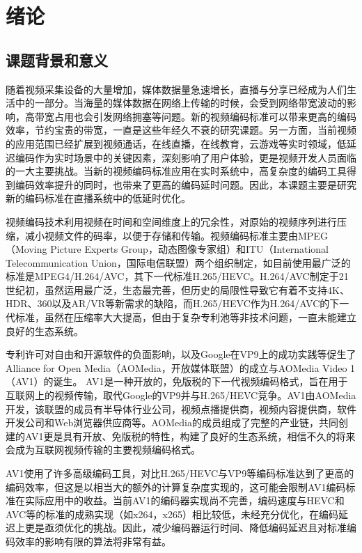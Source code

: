 
\chapter{绪论}
\section{课题背景和意义}

随着视频采集设备的大量增加，媒体数据量急速增长，直播与分享已经成为人们生活中的一部分。当海量的媒体数据在网络上传输的时候，会受到网络带宽波动的影响，高带宽占用也会引发网络拥塞等问题。新的视频编码标准可以带来更高的编码效率，节约宝贵的带宽，一直是这些年经久不衰的研究课题。另一方面，当前视频的应用范围已经扩展到视频通话，在线直播，在线教育，云游戏等实时领域，低延迟编码作为实时场景中的关键因素，深刻影响了用户体验，更是视频开发人员面临的一大主要挑战\cite{Bitmovinvideodeveloperreport2019Pdf2019}。当新的视频编码标准应用在实时系统中，高复杂度的编码工具得到编码效率提升的同时，也带来了更高的编码延时问题。因此，本课题主要是研究新的编码标准在直播系统中的低延时优化。

视频编码技术利用视频在时间和空间维度上的冗余性，对原始的视频序列进行压缩，减小视频文件的码率，以便于存储和传输。视频编码标准主要由MPEG（Moving Picture Experts Group，动态图像专家组）和ITU（International Telecommunication Union，国际电信联盟）两个组织制定，如目前使用最广泛的标准是MPEG4/H.264/AVC，其下一代标准H.265/HEVC。H.264/AVC制定于21世纪初，虽然运用最广泛，生态最完善，但历史的局限性导致它有着不支持4K、HDR、360以及AR/VR等新需求的缺陷，而H.265/HEVC作为H.264/AVC的下一代标准，虽然在压缩率大大提高，但由于复杂专利池等非技术问题，一直未能建立良好的生态系统。

专利许可对自由和开源软件的负面影响，以及Google在VP9上的成功实践等促生了Alliance for Open Media（AOMedia，开放媒体联盟）的成立与AOMedia Video 1（AV1）的诞生。 AV1是一种开放的，免版税的下一代视频编码格式，旨在用于互联网上的视频传输，取代Google的VP9并与H.265/HEVC竞争。AV1由AOMedia开发，该联盟的成员有半导体行业公司，视频点播提供商，视频内容提供商，软件开发公司和Web浏览器供应商等。AOMedia的成员组成了完整的产业链，共同创建的AV1更是具有开放、免版税的特性，构建了良好的生态系统，相信不久的将来会成为互联网视频传输的主要视频编码格式。

AV1使用了许多高级编码工具\cite{chenOverviewCoreCoding2018}，对比H.265/HEVC与VP9等编码标准达到了更高的编码效率\cite{laudeComparisonJEMAV12018,akyaziComparisonCompressionEfficiency2018}，但这是以相当大的额外的计算复杂度实现的，这可能会限制AV1编码标准在实际应用中的收益。当前AV1的编码器实现尚不完善，编码速度与HEVC和AVC等的标准的成熟实现（如x264，x265）相比较低，未经充分优化，在编码延迟上更是亟须优化的挑战。因此，减少编码器运行时间、降低编码延迟且对标准编码效率的影响有限的算法将非常有益。

